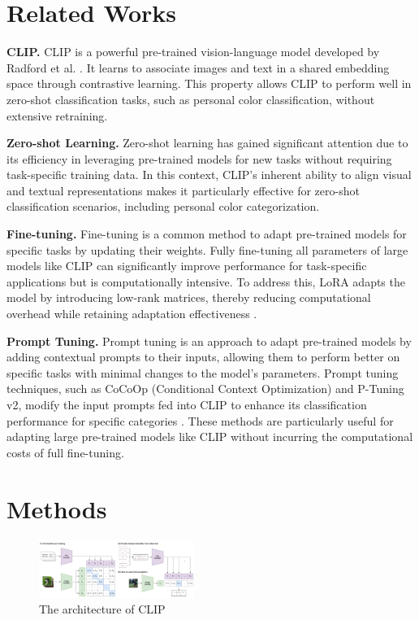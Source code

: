 \documentclass[twocolumn]{article}
\begin{document}
\section{Related Works}
\textbf{CLIP.} CLIP is a powerful pre-trained vision-language model developed by Radford et al. \cite{radford2021learning}. It learns to associate images and text in a shared embedding space through contrastive learning. This property allows CLIP to perform well in zero-shot classification tasks, such as personal color classification, without extensive retraining. 

\textbf{Zero-shot Learning.} Zero-shot learning has gained significant attention due to its efficiency in leveraging pre-trained models for new tasks without requiring task-specific training data. In this context, CLIP's inherent ability to align visual and textual representations makes it particularly effective for zero-shot classification scenarios, including personal color categorization.

\textbf{Fine-tuning.} Fine-tuning is a common method to adapt pre-trained models for specific tasks by updating their weights. Fully fine-tuning all parameters of large models like CLIP can significantly improve performance for task-specific applications but is computationally intensive. To address this, LoRA adapts the model by introducing low-rank matrices, thereby reducing computational overhead while retaining adaptation effectiveness \cite{hu2021lora}.

\textbf{Prompt Tuning.} Prompt tuning is an approach to adapt pre-trained models by adding contextual prompts to their inputs, allowing them to perform better on specific tasks with minimal changes to the model's parameters. Prompt tuning techniques, such as CoCoOp (Conditional Context Optimization) and P-Tuning v2, modify the input prompts fed into CLIP to enhance its classification performance for specific categories \cite{zhou2022conditional, liu2021p}. These methods are particularly useful for adapting large pre-trained models like CLIP without incurring the computational costs of full fine-tuning.

\section{Methods}
\begin{figure}[h]
\centering
\includegraphics[width=0.45\textwidth]{Figure_Final_Project/CLIP_Arch.png}
\caption{The architecture of CLIP}
\label{fig:clip}
\end{figure}
\end{document}
